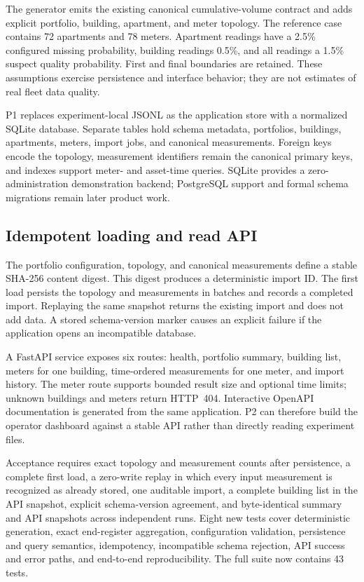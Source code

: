 \documentclass[11pt,a4paper]{article}
\begin{document}
The generator emits the existing canonical cumulative-volume contract and adds
explicit portfolio, building, apartment, and meter topology. The reference case
contains 72 apartments and 78 meters. Apartment readings have a 2.5\% configured
missing probability, building readings 0.5\%, and all readings a 1.5\% suspect
quality probability. First and final boundaries are retained. These assumptions
exercise persistence and interface behavior; they are not estimates of real
fleet data quality.

P1 replaces experiment-local JSONL as the application store with a normalized
SQLite database. Separate tables hold schema metadata, portfolios, buildings,
apartments, meters, import jobs, and canonical measurements. Foreign keys encode
the topology, measurement identifiers remain the canonical primary keys, and
indexes support meter- and asset-time queries. SQLite provides a
zero-administration demonstration backend; PostgreSQL support and formal schema
migrations remain later product work.

\subsection{Idempotent loading and read API}
The portfolio configuration, topology, and canonical measurements define a
stable SHA-256 content digest. This digest produces a deterministic import ID.
The first load persists the topology and measurements in batches and records a
completed import. Replaying the same snapshot returns the existing import and
does not add data. A stored schema-version marker causes an explicit failure if
the application opens an incompatible database.

A FastAPI service exposes six routes: health, portfolio summary, building list,
meters for one building, time-ordered measurements for one meter, and import
history. The meter route supports bounded result size and optional time limits;
unknown buildings and meters return HTTP~404. Interactive OpenAPI documentation
is generated from the same application. P2 can therefore build the operator
dashboard against a stable API rather than directly reading experiment files.

Acceptance requires exact topology and measurement counts after persistence,
a complete first load, a zero-write replay in which every input measurement is
recognized as already stored, one auditable import, a complete building list in
the API snapshot, explicit schema-version agreement, and byte-identical summary
and API snapshots across independent runs. Eight new tests cover deterministic
generation, exact end-register aggregation, configuration validation,
persistence and query semantics, idempotency, incompatible schema rejection,
API success and error paths, and end-to-end reproducibility. The full suite now
contains 43 tests.
\end{document}
